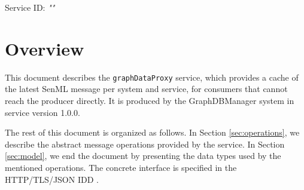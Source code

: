\documentclass[a4paper]{arrowhead}
\begin{document}
\sloppy

\ArrowheadSetup

\begin{center}
  \vspace*{1cm}
  \huge{\arrowtitle}

  \vspace*{0.2cm}
  \LARGE{\arrowtype}
  \vspace*{1cm}

  \Large{Service ID: \textit{"\arrowid"}}

  \vspace*{\fill}


  \vspace*{1cm}
  \vspace*{\fill}

  \begin{abstract}
    This document describes the \texttt{graphDataProxy} service, version 1.0.0, produced by the GraphDBManager support system of Arrowhead 5.2.2.
  \end{abstract}

  \vspace*{1cm}
\end{center}

\newpage

\tableofcontents
\newpage

\section{Overview}
\label{sec:overview}

This document describes the \texttt{graphDataProxy} service, which provides a cache of the latest SenML message per system and service, for consumers that cannot reach the producer directly.
It is produced by the GraphDBManager system \cite{gdm-sysd} in service version 1.0.0.

The rest of this document is organized as follows.
In Section \ref{sec:operations}, we describe the abstract message operations provided by the service.
In Section \ref{sec:model}, we end the document by presenting the data types used by the mentioned operations.
The concrete interface is specified in the HTTP/TLS/JSON IDD \cite{gdm-graphDataProxy-http-idd}.
\end{document}
